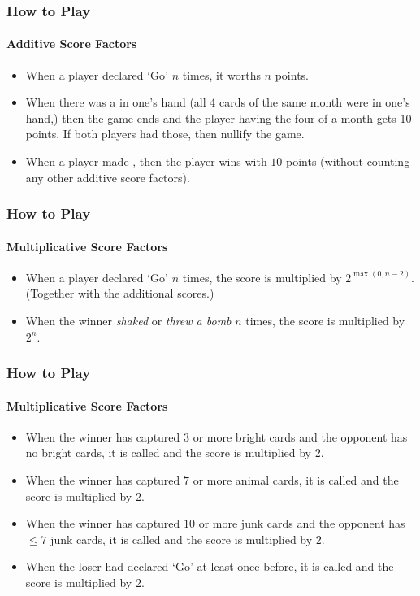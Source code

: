 \begin{frame}[fragile]
\begin{itemize}
  \end{itemize}
\end{frame}

\begin{frame}[fragile]
  \frametitle{How to Play}
  \framesubtitle{Additive Score Factors}

  \begin{itemize}
    \item When a player declared `Go' $n$ times, it worths $n$ points.
    \item When there was a  in one's hand (all 4 cards of the same month were in one's hand,) then the game ends and the player having the four of a month gets 10 points. If both players had those, then nullify the game.
    \item When a player made , then the player wins with $10$ points (without counting any other additive score factors).
  \end{itemize}
\end{frame}

\begin{frame}[fragile]
  \frametitle{How to Play}
  \framesubtitle{Multiplicative Score Factors}

  \begin{itemize}
    \item When a player declared `Go' $n$ times, the score is multiplied by $2^{\max(0, n - 2)}$. (Together with the additional scores.)
    \item When the winner \textit{shaked} or \textit{threw a bomb} $n$ times, the score is multiplied by $2^n$.
  \end{itemize}
\end{frame}

\begin{frame}[fragile]
  \frametitle{How to Play}
  \framesubtitle{Multiplicative Score Factors}

  \begin{itemize}
    \item When the winner has captured $3$ or more bright cards and the opponent has no bright cards, it is called  and the score is multiplied by 2.
    \item When the winner has captured $7$ or more animal cards, it is called  and the score is multiplied by 2.
    \item When the winner has captured $10$ or more junk cards and the opponent has $\le 7$ junk cards, it is called  and the score is multiplied by 2.
    \item When the loser had declared `Go' at least once before, it is called  and the score is multiplied by 2.
  \end{itemize}
\end{frame}